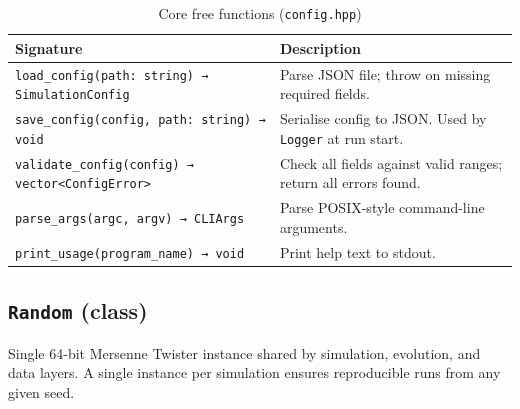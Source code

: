 \begin{table}[H]
\centering\small
\caption{Core free functions (\texttt{config.hpp})}
\begin{tabularx}{\textwidth}{@{}lX@{}}
\toprule
\textbf{Signature} & \textbf{Description} \\
\midrule
\texttt{load\_config(path: string) → SimulationConfig}
  & Parse JSON file; throw on missing required fields. \\
\texttt{save\_config(config, path: string) → void}
  & Serialise config to JSON. Used by \texttt{Logger} at run start. \\
\texttt{validate\_config(config) → vector<ConfigError>}
  & Check all fields against valid ranges; return all errors found. \\
\texttt{parse\_args(argc, argv) → CLIArgs}
  & Parse POSIX-style command-line arguments. \\
\texttt{print\_usage(program\_name) → void}
  & Print help text to stdout. \\
\bottomrule
\end{tabularx}
\end{table}

\subsection{\texttt{Random} (class)}

Single 64-bit Mersenne Twister instance shared by simulation, evolution, and data layers.
A single instance per simulation ensures reproducible runs from any given seed.

